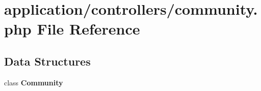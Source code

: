 \section{application/controllers/community.php File Reference}
\label{community_8php}
\subsection*{Data Structures}
\begin{DoxyCompactItemize}
\item 
class {\bf Community}
\end{DoxyCompactItemize}
